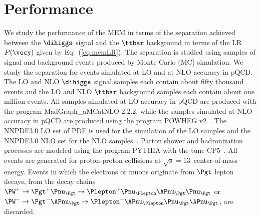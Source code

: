 \section{Performance}
\label{sec:performance}

We study the performance of the MEM in terms of the separation achieved between the $\dihiggs$ signal and the $\ttbar$ background
in terms of the LR $P(\vecy)$ given by Eq.~(\ref{eq:memLR}).
The separation is studied using samples of signal and background events produced by Monte Carlo (MC) simulation.
We study the separation for events simulated at LO and at NLO accuracy in pQCD.
The LO and NLO $\dihiggs$ signal samples each contain about fifty thousand events
and the LO and NLO $\ttbar$ background samples each contain about one million events.
All samples simulated at LO accuracy in pQCD are produced with the program MadGraph\_aMCatNLO 2.2.2,
while the samples simulated at NLO accuracy in pQCD are produced using the program POWHEG v2~\cite{POWHEG1,POWHEG2,POWHEG3,POWHEGTTBAR1,POWHEGTTBAR2,POWHEGHH1,POWHEGHH2}.
The NNPDF3.0 LO set of PDF is used for the simulation of the LO samples and the NNPDF3.0 NLO set for the NLO samples~\cite{NNPDF1,NNPDF2,NNPDF3}.
Parton shower and hadronization processes are modeled using the program PYTHIA with the tune CP5~\cite{PYTHIA_CP5tune_CMS}.
All events are generated for proton-proton collisions at $\sqrt{s} = 13$~\TeV center-of-mass energy.
Events in which the electrons or muons originate from $\Pgt$ lepton decays,
\ie from the decay chains $\PW^{+} \to \Pgt^{+}\Pnu_{\Pgt} \to \Plepton^{+}\Pnu_{\Plepton}\APnu_{\Pgt}\Pnu_{\Pgt}$ or 
$\PW^{-} \to \Pgt^{-}\APnu_{\Pgt} \to \Plepton^{-}\APnu_{\Plepton}\Pnu_{\Pgt}\APnu_{\Pgt}$, are discarded.

